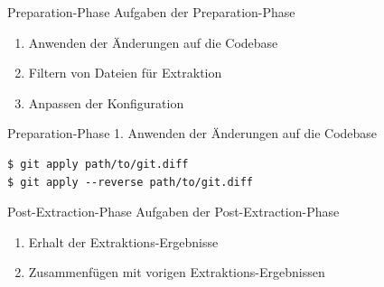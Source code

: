 \documentclass[compress, aspectratio=43, noserifmath]{beamer}
\begin{document}
\begin{frame}{Preparation-Phase}
Aufgaben der Preparation-Phase
\begin{enumerate}
    \item Anwenden der \"Anderungen auf die Codebase
    \item Filtern von Dateien f\"ur Extraktion
    \item Anpassen der Konfiguration
\end{enumerate}
\end{frame}

\begin{frame}[containsverbatim]{Preparation-Phase}
1. Anwenden der \"Anderungen auf die Codebase

\begin{verbatim}
$ git apply path/to/git.diff
$ git apply --reverse path/to/git.diff
\end{verbatim}

\end{frame}


\begin{frame}{Post-Extraction-Phase}
Aufgaben der Post-Extraction-Phase
\begin{enumerate}
    \item Erhalt der Extraktions-Ergebnisse
    \item Zusammenf\"ugen mit vorigen Extraktions-Ergebnissen
\end{enumerate}
\end{frame}
\end{document}
